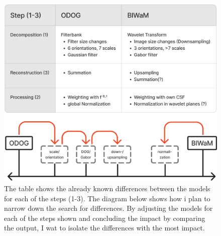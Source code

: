 \begin{figure}[H]
    \centering
    \includegraphics[width=\linewidth]{media/table_differences.png}
    \begin{minipage}{0.8\textwidth}
    \caption{The table shows the already known differences between the models for each of
    the steps (1-3). The diagram below shows how i plan to narrow down the search for
    differences. By adjusting the models for each of the steps shown and concluding the
    impact by comparing the output, I wat to isolate the differences with the most
    impact.}
    \label{fig:figure8}
    \end{minipage}
\end{figure}


\newpage

